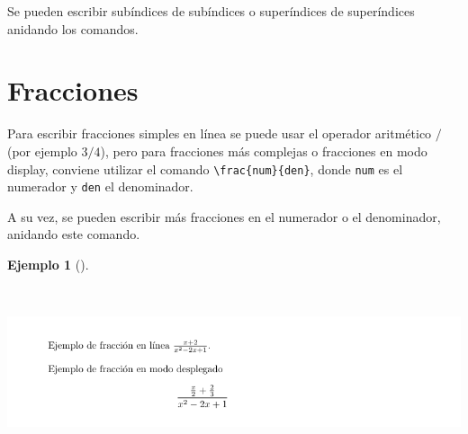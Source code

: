 \documentclass[
  a4paper,
]{scrreport}
\newenvironment{Shaded}{\begin{snugshade}}{\end{snugshade}}
\newcommand{\CommentTok}[1]{\textcolor[rgb]{0.37,0.37,0.37}{#1}}
\newcommand{\ExtensionTok}[1]{\textcolor[rgb]{0.00,0.23,0.31}{#1}}
\newcommand{\KeywordTok}[1]{\textcolor[rgb]{0.00,0.23,0.31}{\textbf{#1}}}
\newcommand{\NormalTok}[1]{\textcolor[rgb]{0.00,0.23,0.31}{#1}}
\newcommand{\SpecialCharTok}[1]{\textcolor[rgb]{0.37,0.37,0.37}{#1}}
\newcommand{\SpecialStringTok}[1]{\textcolor[rgb]{0.13,0.47,0.30}{#1}}
\theoremstyle{definition}
\newtheorem{example}{Ejemplo}[chapter]
\theoremstyle{remark}
\begin{document}
Se pueden escribir subíndices de subíndices o superíndices de
superíndices anidando los comandos.

\section{Fracciones}\label{fracciones}

Para escribir fracciones simples en línea se puede usar el operador
aritmético \(/\) (por ejemplo \(3/4\)), pero para fracciones más
complejas o fracciones en modo display, conviene utilizar el comando
\texttt{\textbackslash{}frac\{num\}\{den\}}, donde \texttt{num} es el
numerador y \texttt{den} el denominador.

A su vez, se pueden escribir más fracciones en el numerador o el
denominador, anidando este comando.

\begin{example}[]\protect\hypertarget{exm-fracciones}{}\label{exm-fracciones}

~

\begin{Shaded}
\end{Shaded}

\begin{tcolorbox}[enhanced jigsaw, colframe=quarto-callout-note-color-frame, opacityback=0, title={Salida}, bottomrule=.15mm, left=2mm, coltitle=black, arc=.35mm, leftrule=.75mm, colback=white, rightrule=.15mm, colbacktitle=quarto-callout-note-color!10!white, toprule=.15mm, breakable, opacitybacktitle=0.6, bottomtitle=1mm, toptitle=1mm, titlerule=0mm]

\includegraphics{img/formulas/fracciones.png}

\end{tcolorbox}

\end{example}
\end{document}
